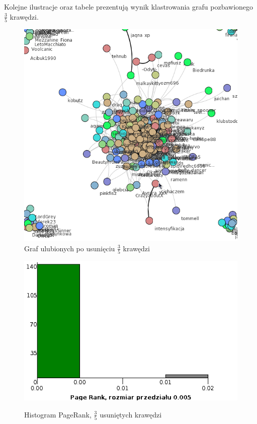 \documentclass[10pt,a4paper]{article}
\begin{document}
  Kolejne ilustracje oraz tabele prezentują wynik klastrowania grafu pozbawionego  $\frac{3}{5}$  krawędzi.
\begin{figure}[H]
\centering
\caption{Graf ulubionych po usunięciu $\frac{3}{5}$ krawędzi}
\includegraphics[scale=0.5]{wyniki/final200Loved/3200loved.png}
\end{figure}

\begin{figure}[H]
\centering
\caption{Histogram PageRank, $\frac{3}{5}$ usuniętych krawędzi}
\includegraphics[scale=0.6]{wyniki/final200Loved/3200lovedPRHist.png}
\label{fig:1200lovedPRHist}
\end{figure}
\end{document}
